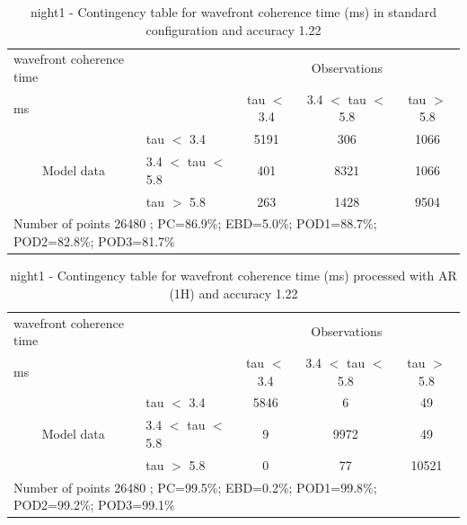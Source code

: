 \begin{table}[p!]
\begin{center}
\begin{tabular}{llccc}
\hline
{wavefront coherence time}                                       &                                                    & \multicolumn{3}{c}{Observations}                 \\
{ms}                                       &                             & tau $<$ 3.4   & 3.4 $<$ tau $<$ 5.8 & tau $>$ 5.8 \\
\hline
\multicolumn{1}{c}{\multirow{3}{*}{Model data}}  & tau $<$ 3.4             & 5191                & 306                       & 1066              \\
                                                 & 3.4  $<$ tau $<$ 5.8 & 401                & 8321                       & 1066              \\
                                                 & tau $>$ 5.8             & 263                & 1428                       & 9504              \\
\hline
\multicolumn{5}{l}{ Number of points        26480 ; PC=86.9\%; EBD=5.0\%; POD1=88.7\%; POD2=82.8\%; POD3=81.7\%}
\end{tabular}
\end{center}
\caption{night1 - Contingency table for  wavefront coherence time (ms) in standard configuration and accuracy 1.22}
\label{tab:contingencytauBEF:night1}
\end{table}
\begin{table}[p!]
\begin{center}
\begin{tabular}{llccc}
\hline
{wavefront coherence time}                                       &                                                    & \multicolumn{3}{c}{Observations}                 \\
{ms}                                       &                             & tau $<$ 3.4   & 3.4 $<$ tau $<$ 5.8 & tau $>$ 5.8 \\
\hline
\multicolumn{1}{c}{\multirow{3}{*}{Model data}}  & tau $<$ 3.4             & 5846                & 6                       & 49              \\
                                                 & 3.4  $<$ tau $<$ 5.8 & 9                & 9972                       & 49              \\
                                                 & tau $>$ 5.8             & 0                & 77                       & 10521              \\
\hline
\multicolumn{5}{l}{ Number of points        26480 ; PC=99.5\%; EBD=0.2\%; POD1=99.8\%; POD2=99.2\%; POD3=99.1\%}
\end{tabular}
\end{center}
\caption{night1 - Contingency table for  wavefront coherence time (ms) processed with AR (1H) and accuracy 1.22}
\label{tab:contingencytauAFT:night1}
\end{table}

